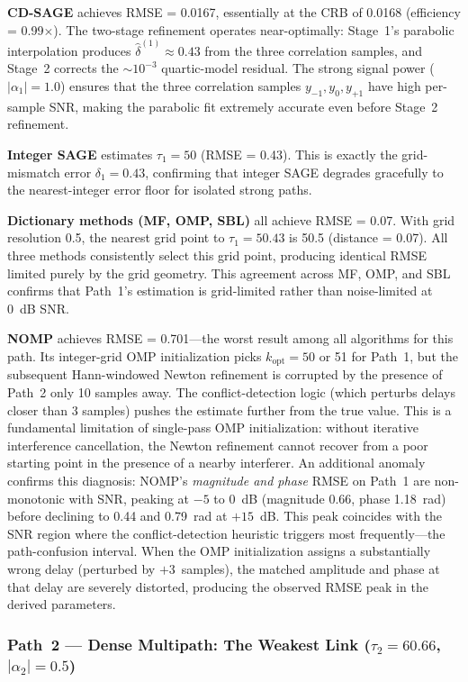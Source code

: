 \documentclass[a4paper,fleqn]{cas-dc}
\begin{document}
\textbf{CD-SAGE} achieves RMSE = 0.0167, essentially at the CRB of 0.0168 (efficiency = 0.99$\times$). The two-stage refinement operates near-optimally: Stage~1's parabolic interpolation produces $\hat{\delta}^{(1)} \approx 0.43$ from the three correlation samples, and Stage~2 corrects the $\sim 10^{-3}$ quartic-model residual. The strong signal power ($|\alpha_1|=1.0$) ensures that the three correlation samples $y_{-1}, y_0, y_{+1}$ have high per-sample SNR, making the parabolic fit extremely accurate even before Stage~2 refinement.

\textbf{Integer SAGE} estimates $\tau_1 = 50$ (RMSE = 0.43). This is exactly the grid-mismatch error $\delta_1 = 0.43$, confirming that integer SAGE degrades gracefully to the nearest-integer error floor for isolated strong paths.

\textbf{Dictionary methods (MF, OMP, SBL)} all achieve RMSE = 0.07. With grid resolution 0.5, the nearest grid point to $\tau_1 = 50.43$ is 50.5 (distance = 0.07). All three methods consistently select this grid point, producing identical RMSE limited purely by the grid geometry. This agreement across MF, OMP, and SBL confirms that Path~1's estimation is grid-limited rather than noise-limited at 0~dB SNR.

\textbf{NOMP} achieves RMSE = 0.701---the worst result among all algorithms for this path. Its integer-grid OMP initialization picks $k_{\text{opt}} = 50$ or 51 for Path~1, but the subsequent Hann-windowed Newton refinement is corrupted by the presence of Path~2 only 10 samples away. The conflict-detection logic (which perturbs delays closer than 3 samples) pushes the estimate further from the true value. This is a fundamental limitation of single-pass OMP initialization: without iterative interference cancellation, the Newton refinement cannot recover from a poor starting point in the presence of a nearby interferer. An additional anomaly confirms this diagnosis: NOMP's \textit{magnitude and phase} RMSE on Path~1 are non-monotonic with SNR, peaking at $-5$ to $0$~dB (magnitude 0.66, phase 1.18~rad) before declining to 0.44 and 0.79~rad at $+15$~dB. This peak coincides with the SNR region where the conflict-detection heuristic triggers most frequently---the path-confusion interval. When the OMP initialization assigns a substantially wrong delay (perturbed by $+3$~samples), the matched amplitude and phase at that delay are severely distorted, producing the observed RMSE peak in the derived parameters.

\subsubsection{Path~2 --- Dense Multipath: The Weakest Link ($\tau_2 = 60.66$, $|\alpha_2| = 0.5$)}
\end{document}
